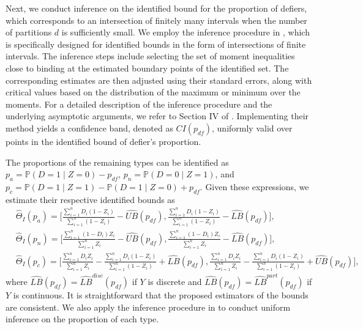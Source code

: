 \documentclass[12pt]{article}
\theoremstyle{plain}
\theoremstyle{definition}
\theoremstyle{remark}
\begin{document}
Next, we conduct inference on the identified bound for the proportion of defiers, which corresponds to an intersection of finitely many intervals when the number of partitions $d$ is sufficiently small. We employ the inference procedure in \cite{Nevo2012IdentificationInstruments}, which is specifically designed for identified bounds in the form of intersections of finite intervals. The inference steps include selecting the set of moment inequalities close to binding at the estimated boundary points of the identified set. The corresponding estimates are then adjusted using their standard errors, along with critical values based on the distribution of the maximum or minimum over the moments. For a detailed description of the inference procedure and the underlying asymptotic arguments, we refer to Section IV of \cite{Nevo2012IdentificationInstruments}. Implementing their method yields a confidence band, denoted as $CI(p_{df})$, uniformly valid over points in the identified bound of defier's proportion. 

The proportions of the remaining types can be identified as $p_a = \mathbb{P}(D = 1 \mid Z = 0) - p_{df}$, $p_n = \mathbb{P}(D=0 \mid Z=1)$, and $p_c = \mathbb{P}(D = 1 \mid Z = 1) - \mathbb{P}(D = 1 \mid Z = 0) + p_{df}$. Given these expressions, we estimate their respective identified bounds as
\begin{equation*}
    \begin{aligned}
        & \widehat{\Theta}_I(p_a) = \bigg[\frac{\sum_{i=1}^{n}D_i (1-Z_i)}{\sum_{i=1}^{n}(1-Z_i)} - \widehat{UB}(p_{df}), \frac{\sum_{i=1}^{n}D_i (1-Z_i)}{\sum_{i=1}^{n}(1-Z_i)} - \widehat{LB}(p_{df}) \bigg], \\
        & \widehat{\Theta}_I(p_n) = \bigg[\frac{\sum_{i=1}^{n}(1-D_i) Z_i}{\sum_{i=1}^{n}Z_i} - \widehat{UB}(p_{df}), \frac{\sum_{i=1}^{n}(1-D_i) Z_i}{\sum_{i=1}^{n}Z_i} - \widehat{LB}(p_{df}) \bigg], \\
        & \widehat{\Theta}_I(p_c) = \bigg[\frac{\sum_{i=1}^{n}D_i Z_i}{\sum_{i=1}^{n}Z_i} - \frac{\sum_{i=1}^{n}D_i (1-Z_i)}{\sum_{i=1}^{n}(1-Z_i)} + \widehat{LB}(p_{df}), \frac{\sum_{i=1}^{n}D_i Z_i}{\sum_{i=1}^{n}Z_i} - \frac{\sum_{i=1}^{n}D_i (1-Z_i)}{\sum_{i=1}^{n}(1-Z_i)} + \widehat{UB}(p_{df}) \bigg],
    \end{aligned}
\end{equation*}
where $\widehat{LB}(p_{df}) = \widehat{LB}^{disc}(p_{df})$ if $Y$ is discrete and $\widehat{LB}(p_{df}) = \widehat{LB}^{part}(p_{df})$ if $Y$ is continuous. It is straightforward that the proposed estimators of the bounds are consistent. We also apply the inference procedure in \cite{Nevo2012IdentificationInstruments} to conduct uniform inference on the proportion of each type.
\end{document}

